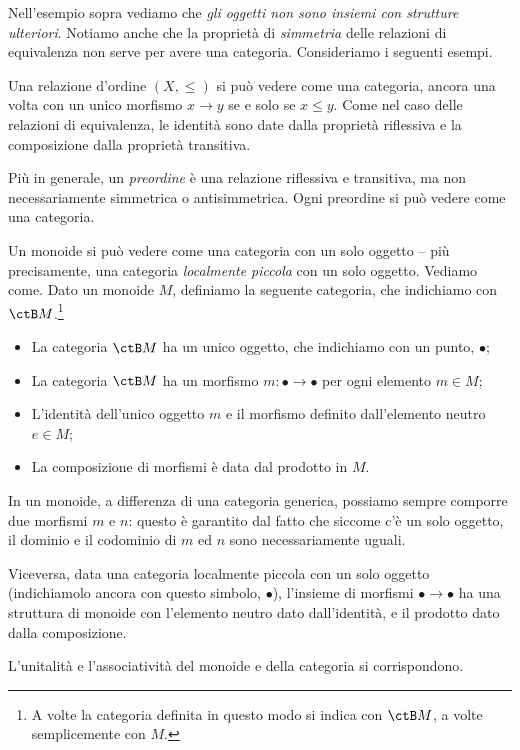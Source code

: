 Nell'esempio sopra vediamo che \emph{gli oggetti non sono insiemi con strutture ulteriori}. 
Notiamo anche che la proprietà di \emph{simmetria} delle relazioni di equivalenza non serve per avere una categoria. Consideriamo i seguenti esempi.

\begin{examples}
 Una relazione d'ordine $(X,\le)$ si può vedere come una categoria, ancora una volta con un unico morfismo $x\to y$ se e solo se $x\le y$. Come nel caso delle relazioni di equivalenza, le identità sono date dalla proprietà riflessiva e la composizione dalla proprietà transitiva. 
 
 Più in generale, un \emph{preordine} è una relazione riflessiva e transitiva, ma non necessariamente simmetrica o antisimmetrica. Ogni preordine si può vedere come una categoria.
\end{examples}


\begin{example}
 Un monoide si può vedere come una categoria con un solo oggetto -- più precisamente, una categoria \emph{localmente piccola} con un solo oggetto. 
 Vediamo come. Dato un monoide $M$, definiamo la seguente categoria, che indichiamo con $\ctB M$.\footnote{A volte la categoria definita in questo modo si indica con $\ctB M$, a volte semplicemente con $M$.}
 \begin{itemize}
  \item La categoria $\ctB M$ ha un unico oggetto, che indichiamo con un punto, $\bullet$;
  \item La categoria $\ctB M$ ha un morfismo $m:\bullet\to\bullet$ per ogni elemento $m\in M$;
  \item L'identità dell'unico oggetto $m$ e il morfismo definito dall'elemento neutro $e\in M$;
  \item La composizione di morfismi è data dal prodotto in $M$.
 \end{itemize}
 In un monoide, a differenza di una categoria generica, possiamo sempre comporre due morfismi $m$ e $n$: questo è garantito dal fatto che siccome c'è un solo oggetto, il dominio e il codominio di $m$ ed $n$ sono necessariamente uguali. 
 
 Viceversa, data una categoria localmente piccola con un solo oggetto (indichiamolo ancora con questo simbolo, $\bullet$), l'insieme di morfismi $\bullet\to\bullet$ ha una struttura di monoide con l'elemento neutro dato dall'identità, e il prodotto dato dalla composizione.
 
 L'unitalità e l'associatività del monoide e della categoria si corrispondono.
\end{example}

